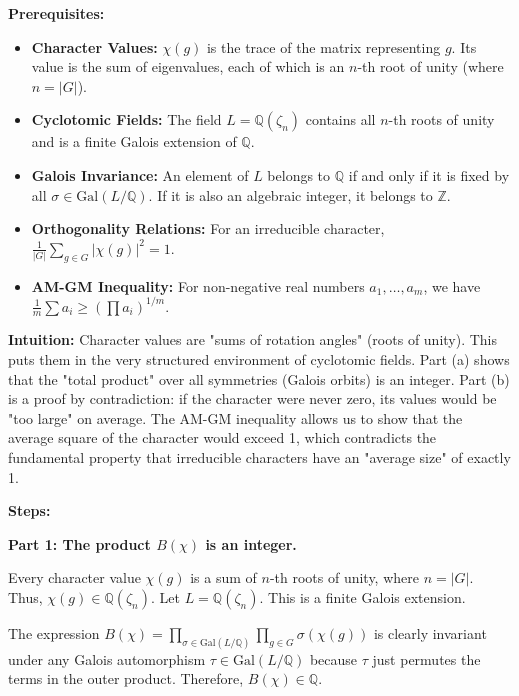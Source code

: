 \begin{solution}
\textbf{Prerequisites:}
\begin{itemize}
    \item \textbf{Character Values:} $\chi(g)$ is the trace of the matrix representing $g$. Its value is the sum of eigenvalues, each of which is an $n$-th root of unity (where $n = |G|$).
    \item \textbf{Cyclotomic Fields:} The field $L = \mathbb{Q}(\zeta_n)$ contains all $n$-th roots of unity and is a finite Galois extension of $\mathbb{Q}$.
    \item \textbf{Galois Invariance:} An element of $L$ belongs to $\mathbb{Q}$ if and only if it is fixed by all $\sigma \in \mathrm{Gal}(L/\mathbb{Q})$. If it is also an algebraic integer, it belongs to $\mathbb{Z}$.
    \item \textbf{Orthogonality Relations:} For an irreducible character, $\frac{1}{|G|} \sum_{g \in G} |\chi(g)|^2 = 1$.
    \item \textbf{AM-GM Inequality:} For non-negative real numbers $a_1, \dots, a_m$, we have $\frac{1}{m} \sum a_i \geq \left( \prod a_i \right)^{1/m}$.
\end{itemize}

\bigskip

\textbf{Intuition:}
Character values are "sums of rotation angles" (roots of unity). This puts them in the very structured environment of cyclotomic fields. Part (a) shows that the "total product" over all symmetries (Galois orbits) is an integer. Part (b) is a proof by contradiction: if the character were never zero, its values would be "too large" on average. The AM-GM inequality allows us to show that the average square of the character would exceed 1, which contradicts the fundamental property that irreducible characters have an "average size" of exactly 1.

\bigskip

\textbf{Steps:}

\textbf{Part 1: The product $B(\chi)$ is an integer.}

Every character value $\chi(g)$ is a sum of $n$-th roots of unity, where $n = |G|$. Thus, $\chi(g) \in \mathbb{Q}(\zeta_n)$. Let $L = \mathbb{Q}(\zeta_n)$. This is a finite Galois extension.

\bigskip

The expression $B(\chi) = \prod_{\sigma \in \mathrm{Gal}(L/\mathbb{Q})} \prod_{g \in G} \sigma(\chi(g))$ is clearly invariant under any Galois automorphism $\tau \in \mathrm{Gal}(L/\mathbb{Q})$ because $\tau$ just permutes the terms in the outer product. Therefore, $B(\chi) \in \mathbb{Q}$.


\end{solution}
